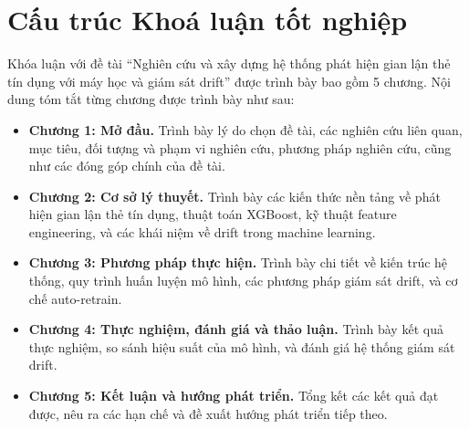 \section{Cấu trúc Khoá luận tốt nghiệp}
\label{sec:CauTruc}
Khóa luận với đề tài ``Nghiên cứu và xây dựng hệ thống phát hiện gian lận thẻ tín dụng với máy học và giám sát drift'' được trình bày bao gồm 5 chương. Nội dung tóm tắt từng chương được trình bày như sau:

\begin{itemize}
    \item \textbf{Chương 1: Mở đầu.} Trình bày lý do chọn đề tài, các nghiên cứu liên quan, mục tiêu, đối tượng và phạm vi nghiên cứu, phương pháp nghiên cứu, cũng như các đóng góp chính của đề tài.
    
    \item \textbf{Chương 2: Cơ sở lý thuyết.} Trình bày các kiến thức nền tảng về phát hiện gian lận thẻ tín dụng, thuật toán XGBoost, kỹ thuật feature engineering, và các khái niệm về drift trong machine learning.
    
    \item \textbf{Chương 3: Phương pháp thực hiện.} Trình bày chi tiết về kiến trúc hệ thống, quy trình huấn luyện mô hình, các phương pháp giám sát drift, và cơ chế auto-retrain.
    
    \item \textbf{Chương 4: Thực nghiệm, đánh giá và thảo luận.} Trình bày kết quả thực nghiệm, so sánh hiệu suất của mô hình, và đánh giá hệ thống giám sát drift.
    
    \item \textbf{Chương 5: Kết luận và hướng phát triển.} Tổng kết các kết quả đạt được, nêu ra các hạn chế và đề xuất hướng phát triển tiếp theo.
\end{itemize}